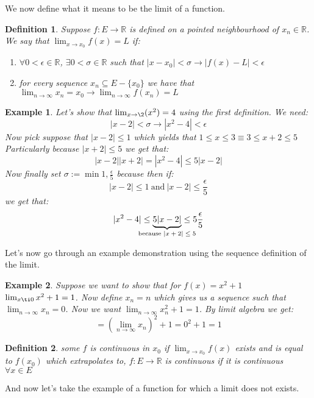 \documentclass[titlepage]{article}
\newtheorem{definition}{Definition}
\numberwithin{equation}{subsection}
\newtheorem{example}{Example}[section]
\begin{document}
We now define what it means to be the limit of a function. 

\begin{definition}
Suppose $f:E\to\mathbb{R}$ is defined on a pointed neighbourhood of $x_{n}\in \mathbb{R}$. We say that $\lim_{x \to x_{0}} f(x) = L$ if:
\begin{enumerate}
    \item $\forall 0 < \epsilon \in \mathbb{R}$, $\exists 0<\sigma \in \mathbb{R} $ such that $|x - x_{0}| < \sigma \rightarrow |f(x) - L| < \epsilon$
    \item for every sequence $x_{n} \subseteq E-\{x_{0}\}$ we have that $\lim_{n\to \infty}x_{n} = x_{0} \rightarrow \lim_{n\to\infty}f(x_{n})=L$
\end{enumerate}
\end{definition}

\begin{example}
Let's show that $\lim_{x\to\2}(x^2) = 4$ using the first definition.
We need:
$$ |x-2| < \sigma \rightarrow |x^2 - 4| < \epsilon$$
Now pick suppose that $|x-2| \leq 1 $ which yields that $ 1\leq x \leq 3 \equiv 3\leq x + 2 \leq 5$ Particularly because $|x+2| \leq 5$ we get that:
$$ |x-2||x+2| = |x^2 - 4| \leq 5|x-2|$$
Now finally set $\sigma := \min{1,\frac{\epsilon}{5}}$ because then if:
$$ |x-2| \leq 1 \ \text{and} \ |x-2| \leq \frac{\epsilon}{5}$$ we get that:
$$ |x^2 - 4| \leq \underbrace{5|x-2|}_{\text{\makebox[0pt]{because $|x+2|\leq5$}}} \leq 5\frac{\epsilon}{5}$$
\end{example}
  
Let's now go through an example demonstration using the sequence definition of the limit.

\begin{example}
Suppose we want to show that for $f(x) = x^2 + 1$ $ \lim_{x \ti 0} x^2 + 1 = 1$. Now define $x_{n} = n$ which gives us a sequence such that $\lim_{n \to \infty}x_{n} = 0$. Now we want $\lim_{n \to \infty}x_{n}^{2} + 1 = 1$. By limit algebra we get:
$$ = (\lim_{n \to \infty}x_{n})^2 + 1 = 0^2 + 1 = 1$$
\end{example}

\begin{definition}
some $f$ is continuous in $x_{0}$ if $\lim_{x \to x_{0}} f(x)$ exists and is equal to $f(x_{0})$ which extrapolates to, $f:E \to \mathbb{R}$ is continuous if it is continuous $\forall x \in E$
\end{definition}

And now let's take the example of a function for which a limit does not exists. 
\end{document}
